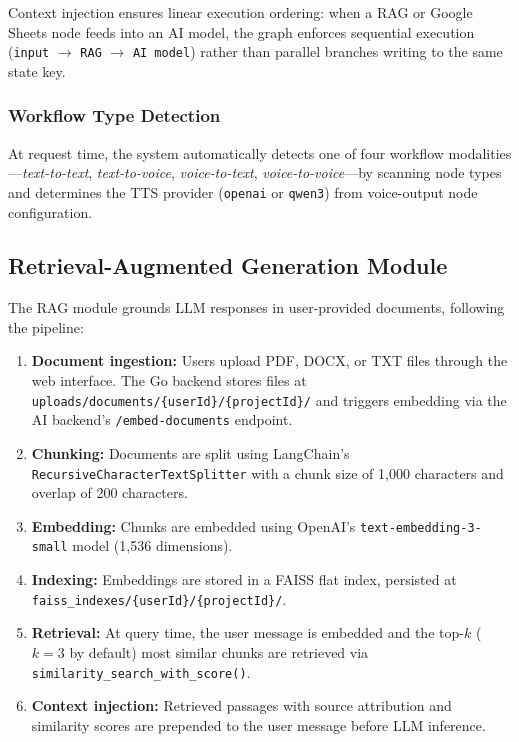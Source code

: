 \documentclass[10pt, a4paper, twocolumn]{article}
\begin{document}
\noindent Context injection ensures linear execution ordering: when a RAG or Google Sheets node feeds into an AI model, the graph enforces sequential execution (\texttt{input} $\rightarrow$ \texttt{RAG} $\rightarrow$ \texttt{AI model}) rather than parallel branches writing to the same state key.

\subsubsection{Workflow Type Detection}
At request time, the system automatically detects one of four workflow modalities---\textit{text-to-text}, \textit{text-to-voice}, \textit{voice-to-text}, \textit{voice-to-voice}---by scanning node types and determines the TTS provider (\texttt{openai} or \texttt{qwen3}) from voice-output node configuration.

\subsection{Retrieval-Augmented Generation Module}
\label{sec:rag}

The RAG module grounds LLM responses in user-provided documents, following the pipeline:

\begin{enumerate}[label=\arabic*.]
    \item \textbf{Document ingestion:} Users upload PDF, DOCX, or TXT files through the web interface. The Go backend stores files at \texttt{uploads/documents/\{userId\}/\{projectId\}/} and triggers embedding via the AI backend's \texttt{/embed-documents} endpoint.
    \item \textbf{Chunking:} Documents are split using LangChain's \texttt{RecursiveCharacterTextSplitter} with a chunk size of 1{,}000 characters and overlap of 200 characters.
    \item \textbf{Embedding:} Chunks are embedded using OpenAI's \texttt{text-embedding-3-small} model (1{,}536 dimensions).
    \item \textbf{Indexing:} Embeddings are stored in a FAISS flat index, persisted at \texttt{faiss\_indexes/\{userId\}/\{projectId\}/}.
    \item \textbf{Retrieval:} At query time, the user message is embedded and the top-$k$ ($k{=}3$ by default) most similar chunks are retrieved via \texttt{similarity\_search\_with\_score()}.
    \item \textbf{Context injection:} Retrieved passages with source attribution and similarity scores are prepended to the user message before LLM inference.
\end{enumerate}
\end{document}
